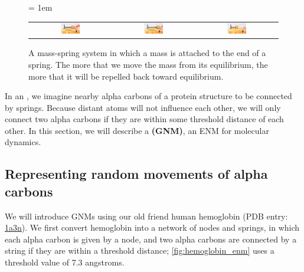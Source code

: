 \begin{figure}[h]
	\centering
	\tabcolsep = 1em
	\mySfFamily
	\begin{tabular}{c c c}
		\includegraphics[width = 0.25\textwidth]{../images_CMYK/mass_spring1} & \includegraphics[width = 0.25\textwidth]{../images_CMYK/mass_spring2} & \includegraphics[width = 0.25\textwidth]{../images_CMYK/mass_spring3}
	\end{tabular}
	\caption{A mass-spring system in which a mass is attached to the end of a spring. The more that we move the mass from its equilibrium, the more that it will be repelled back toward equilibrium.}
	\label{fig:mass-spring}
\end{figure}


In an , we imagine nearby alpha carbons of a protein structure to be connected by springs. Because distant atoms will not influence each other, we will only connect two alpha carbons if they are within some threshold distance of each other. In this section, we will describe a  \textbf{(GNM)}, an ENM for molecular dynamics.


\FloatBarrier
{}
\subsection{Representing random movements of alpha carbons}

We will introduce GNMs using our old friend human hemoglobin (PDB entry: \href{https://www.rcsb.org/structure/1a3n}{1a3n}). We first convert hemoglobin into a network of nodes and springs, in which each alpha carbon is given by a node, and two alpha carbons are connected by a string if they are within a threshold distance; \autoref{fig:hemoglobin_enm} uses a threshold value of 7.3 angstroms.

